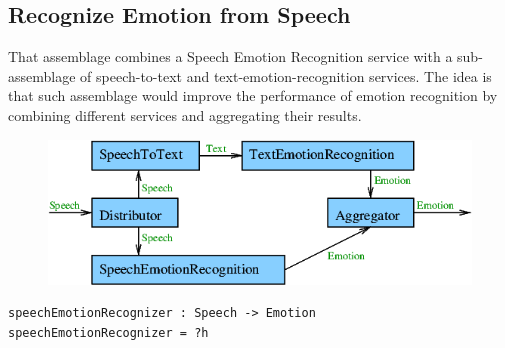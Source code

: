 \documentclass[]{article}
\begin{document}
\subsection{Recognize Emotion from Speech}
That assemblage combines a Speech Emotion Recognition service with a
sub-assemblage of speech-to-text and text-emotion-recognition
services.  The idea is that such assemblage would improve the
performance of emotion recognition by combining different services and
aggregating their results.
\begin{figure}[H]
  \centering
  \includegraphics[scale=0.55]{figs/SpeechEmotionRecognition.png}
\end{figure}
\begin{verbatim}
speechEmotionRecognizer : Speech -> Emotion
speechEmotionRecognizer = ?h
\end{verbatim}
\end{document}
